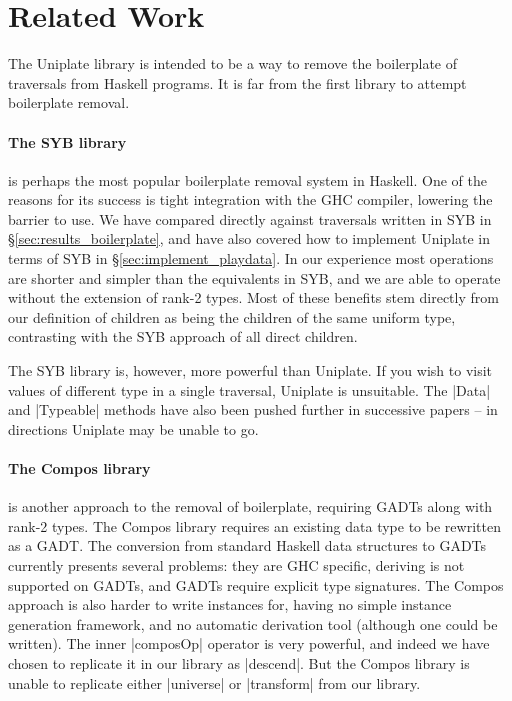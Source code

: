 \documentclass[preprint]{sigplanconf}
\begin{document}
\section{Related Work}
\label{sec:related}

The Uniplate library is intended to be a way to remove the boilerplate of traversals from Haskell programs. It is far from the first library to attempt boilerplate removal.

\paragraph{The SYB library} \citep{lammel:syb} is perhaps the most popular boilerplate removal system in Haskell. One of the reasons for its success is tight integration with the GHC compiler, lowering the barrier to use. We have compared directly against traversals written in SYB in \S\ref{sec:results_boilerplate}, and have also covered how to implement Uniplate in terms of SYB in \S\ref{sec:implement_playdata}. In our experience most operations are shorter and simpler than the equivalents in SYB, and we are able to operate without the extension of rank-2 types. Most of these benefits stem directly from our definition of children as being the children of the same uniform type, contrasting with the SYB approach of all direct children.

The SYB library is, however, more powerful than Uniplate. If you wish to visit values of different type in a single traversal, Uniplate is unsuitable. The |Data| and |Typeable| methods have also been pushed further in successive papers \citep{lammel:syb2,lammel:syb3} -- in directions Uniplate may be unable to go.

\paragraph{The Compos library} \citep{bringert:compos} is another approach to the removal of boilerplate, requiring GADTs \citep{spj:gadt} along with rank-2 types. The Compos library requires an existing data type to be rewritten as a GADT. The conversion from standard Haskell data structures to GADTs currently presents several problems: they are GHC specific, deriving is not supported on GADTs, and GADTs require explicit type signatures. The Compos approach is also harder to write instances for, having no simple instance generation framework, and no automatic derivation tool (although one could be written). The inner |composOp| operator is very powerful, and indeed we have chosen to replicate it in our library as |descend|. But the Compos library is unable to replicate either |universe| or |transform| from our library.
\end{document}
